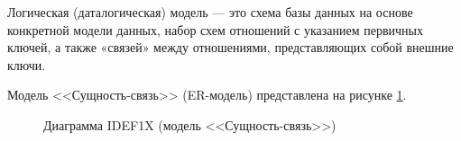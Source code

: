 Логическая (даталогическая) модель --- это схема базы данных на основе конкретной модели данных, набор схем отношений с указанием первичных ключей, а также «связей» между отношениями, представляющих собой внешние ключи.

Модель <<Сущность-связь>> (ER-модель) представлена на рисунке \ref{idef1x:idef1x}.

\begin{figure}[h!]
\caption{Диаграмма IDEF1X (модель <<Сущность-связь>>)}
\label{idef1x:idef1x}
\end{figure} 

\clearpage
